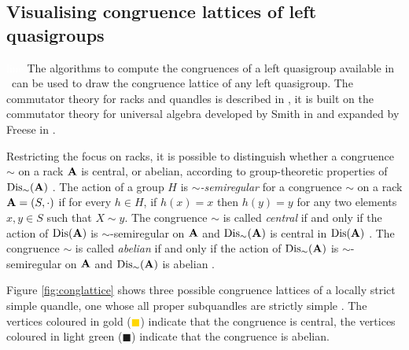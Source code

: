 \subsection{Visualising congruence lattices of left quasigroups}\textcolor{white}{line}\newline
\noindent The algorithms to compute the congruences of a left quasigroup available in \Software~can be used to draw the congruence lattice of any left quasigroup. The commutator theory for racks and quandles is described in \cite{BonStanCommTheory2021}, it is built on the commutator theory for universal algebra developed by Smith in \cite{smith1976varieties} and expanded by Freese in \cite{freese1987commutator}. 

Restricting the focus on racks, it is possible to distinguish whether a congruence $\sim$ on a rack $\mathbf{A}$ is central, or abelian, according to group-theoretic properties of $\operatorname{Dis}_\sim(\mathbf{A})$ \cite{BonStanCommTheory2021}. The action of a group $H$ is $\sim$\emph{-semiregular} for a congruence $\sim$ on a rack $\mathbf{A} = (S, \cdot)$ if for every $h\in H$, if $h(x) = x$ then $h(y)=y$ for any two elements $x,y \in S$ such that $X\sim y$. The congruence $\sim$ is called \emph{central} if and only if the action of $\operatorname{Dis}(\mathbf{A})$ is $\sim$-semiregular on $\mathbf{A}$ and $\operatorname{Dis}_\sim(\mathbf{A})$ is central in $\operatorname{Dis}(\mathbf{A})$ \cite{BonStanCommTheory2021}. The congruence $\sim$ is called \emph{abelian} if and only if the action of $\operatorname{Dis}_\sim(\mathbf{A})$ is $\sim$-semiregular on $\mathbf{A}$ and $\operatorname{Dis}_\sim(\mathbf{A})$ is abelian \cite{BonStanCommTheory2021}. 

Figure \ref{fig:conglattice} shows three possible congruence lattices of a locally strict simple quandle, one whose all proper subquandles are strictly simple \cite{bonatto2022connected}. The vertices coloured in gold (\textcolor{gold}{$\blacksquare$}) indicate that the congruence is central, the vertices coloured in light green (\textcolor{olivedrab1}{$\blacksquare$}) indicate that the congruence is abelian.

